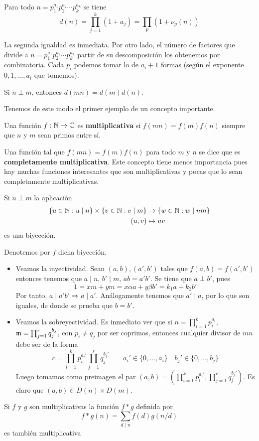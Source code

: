 \documentclass[TAN.tex]{subfiles}
\begin{document}
\begin{prop}
Para todo $n = p_1^{a_1}p_2^{a_2}\cdots p_k^{a_k}$ se tiene
\[ d(n) = \prod_{j=1}^k (1+a_j) = \prod_p (1+ν_p(n)) \]
\end{prop}
\begin{dem}
La segunda igualdad es inmediata. Por otro lado, el número de factores que divide a $n = p_1^{a_1}p_2^{a_2}\cdots p_k^{a_k}$  partir de su descomposición los obtenemos por combinatoria. Cada $p_i$ podemos tomar lo de $a_i+1$ formas (según el exponente $0,1,\dotsc,a_i$ que tomemos).
\end{dem}
\begin{coro}
Si $n \perp m$, entonces $d(mn) = d(m)d(n)$.
\end{coro}

Tenemos de este modo el primer ejemplo de un concepto importante.

\begin{defi}
Una función $f : \mathbb{N} \to \mathbb{C}$ es \textbf{multiplicativa} si $f(mn) = f(m)f(n)$ siempre que $n$ y $m$ sean primos entre sí.

Una función tal que $f(mn)=f(m)f(n)$ para todo $m$ y $n$ se dice que es \textbf{completamente multiplicativa}.
Este concepto tiene menos importancia pues hay muchas funciones interesantes que son multiplicativas y pocas que lo sean completamente multiplicativas.
\end{defi}

\begin{prop}
Si $n \perp m$ la aplicación
\begin{align*}
	\{ u \in \mathbb{N} : u \mid n\} \times \{v \in \mathbb{N} : v \mid m\} & \rightarrow \{ w \in \mathbb{N} : w \mid nm \}\\
	(u,v) & \mapsto uv
\end{align*}
es una biyección.
\end{prop}
\begin{dem}
Denotemos por $f$ dicha biyección. 
\begin{itemize} 
\item Veamos la inyectividad. Sean $(a,b),(a',b')$ tales que $f(a,b)=f(a',b')$ entonces tenemos que $a\mid n$, $b'\mid m$, $ab=a'b'$. Se tiene que $a\perp b'$, pues
$$
1=xm+ym = x\alpha a + y\beta b' = k_1 a + k_2 b'
$$
Por tanto, $a\mid a'b' \Rightarrow a\mid a'$. Análogamente tenemos que $a'\mid a$, por lo que son iguales, de donde se prueba que $b=b'$. 
\item Veamos la sobreyectividad. Es inmediato ver que si $n=\prod_{i=1}^k p_i ^{a_i}$, ${\mathfrak{m}}=\prod_{j=1}^r q_j^{b_j}$, con $p_i \neq q_j$ por ser coprimos, entonces cualquier divisor de $mn$ debe ser de la forma
$$
c = \prod_{i=1}^k p_i ^{a_i'}\prod_{j=1}^r q_j^{b_j'} \qquad a_i' \in \{0,\dotsc,a_i\} \quad b_j' \in \{0,\dotsc,b_j\}
$$
Luego tomamos como preimagen el par $(a,b) = (\prod_{i=1}^k p_i ^{a_i'},\prod_{j=1}^r q_j^{b_j'})$. Es claro que $(a,b) \in D(n)\times D(m)$.
\end{itemize}
\end{dem}
\begin{prop} Si $f$ y $g$ son multiplicativas la función $f * g$ definida por
\[ f * g (n) = \sum_{d\mid n} f(d)g(n/d) \]
es también multiplicativa
\end{prop}
\end{document}
